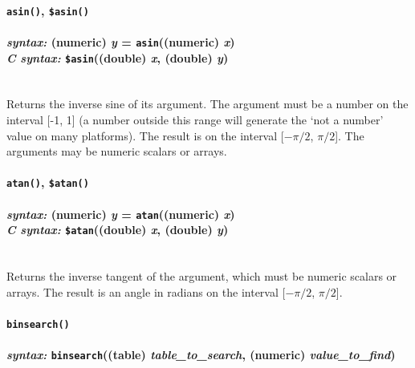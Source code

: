 \documentclass{article}
\begin{document}





\paragraph{\texttt{asin()}, \texttt{\$asin()}\\\\
\normalfont \emph{syntax: } (numeric) \emph{y} = \texttt{asin}((numeric) \emph{x})\\
\normalfont \emph{C syntax: } \texttt{\$asin}((double) \emph{x}, (double) \emph{y})\\\\}

Returns the inverse sine of its argument.  The argument must be a number on the interval [-1, 1] (a number outside this range will generate the `not a number' value on many platforms).  The result is on the interval [$-\pi/2$, $\pi/2$].  The arguments may be numeric scalars or arrays.\\






\paragraph{\texttt{atan()}, \texttt{\$atan()}\\\\
\normalfont \emph{syntax: } (numeric) \emph{y} = \texttt{atan}((numeric) \emph{x})\\
\normalfont \emph{C syntax: } \texttt{\$atan}((double) \emph{x}, (double) \emph{y})\\\\}

Returns the inverse tangent of the argument, which must be numeric scalars or arrays.  The result is an angle in radians on the interval [$-\pi/2$, $\pi/2$].\\





\paragraph{\texttt{binsearch()}\\\\
\normalfont \emph{syntax: } \texttt{binsearch}((table) \emph{table\_to\_search}, (numeric) \emph{value\_to\_find})\\\\}
\end{document}
